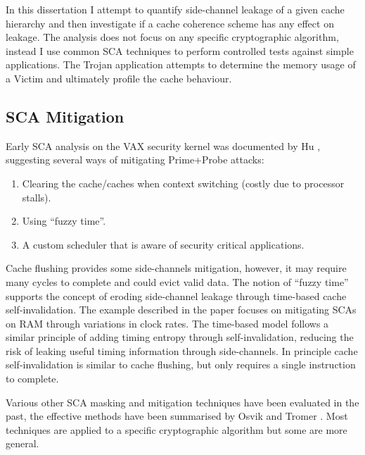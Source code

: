 		In this dissertation I attempt to quantify side-channel leakage of a given cache hierarchy and then investigate if a cache coherence scheme has any effect on leakage. The analysis does not focus on any specific cryptographic algorithm, instead I use common SCA techniques to perform controlled tests against simple applications. The Trojan application attempts to determine the memory usage of a Victim and ultimately profile the cache behaviour.

	\subsection{SCA Mitigation}
		Early SCA analysis on the VAX security kernel was documented by Hu \cite{Hu91,Hu92}, suggesting several ways of mitigating Prime+Probe attacks:
		\begin{enumerate}
			\item Clearing the cache/caches when context switching (costly due to processor stalls).
			\item Using ``fuzzy time''.
			\item A custom scheduler that is aware of security critical applications.
		\end{enumerate}
		Cache flushing provides some side-channels mitigation, however, it may require many cycles to complete and could evict valid data. The notion of ``fuzzy time'' supports the concept of eroding side-channel leakage through time-based cache self-invalidation. The example described in the paper focuses on mitigating SCAs on RAM through variations in clock rates. 
		The time-based model follows a similar principle of adding timing entropy through self-invalidation, reducing the risk of leaking useful timing information through side-channels.
		In principle cache self-invalidation is similar to cache flushing, but only requires a single instruction to complete.
	
		Various other SCA masking and mitigation techniques have been evaluated in the past, the effective methods have been summarised by Osvik and Tromer \cite{Osvik06,Tromer10}. Most techniques are applied to a specific cryptographic algorithm but some are more general. 
		
